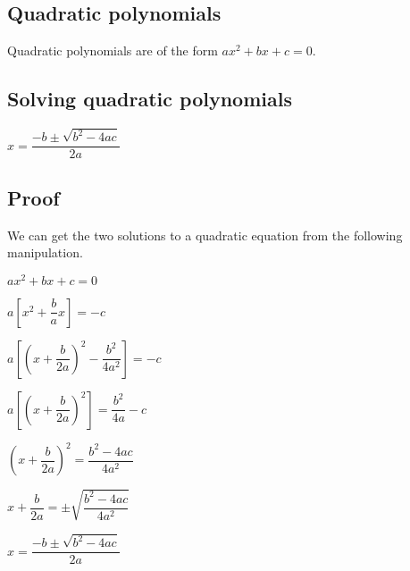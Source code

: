 
\subsection{Quadratic polynomials}

Quadratic polynomials are of the form \(ax^2+bx+c=0\).

\subsection{Solving quadratic polynomials}

\(x=\dfrac{-b\pm \sqrt {b^2-4ac}}{2a}\)

\subsection{Proof}

We can get the two solutions to a quadratic equation from the following manipulation.

\(ax^2+bx+c=0\)

\(a[x^2+\dfrac{b}{a}x]=-c\)

\(a[(x+\dfrac{b}{2a})^2-\dfrac{b^2}{4a^2}]=-c\)

\(a[(x+\dfrac{b}{2a})^2]=\dfrac{b^2}{4a}-c\)

\((x+\dfrac{b}{2a})^2=\dfrac{b^2-4ac}{4a^2}\)

\(x+\dfrac{b}{2a}=\pm \sqrt {\dfrac{b^2-4ac}{4a^2}}\)

\(x=\dfrac{-b\pm \sqrt {b^2-4ac}}{2a}\)

